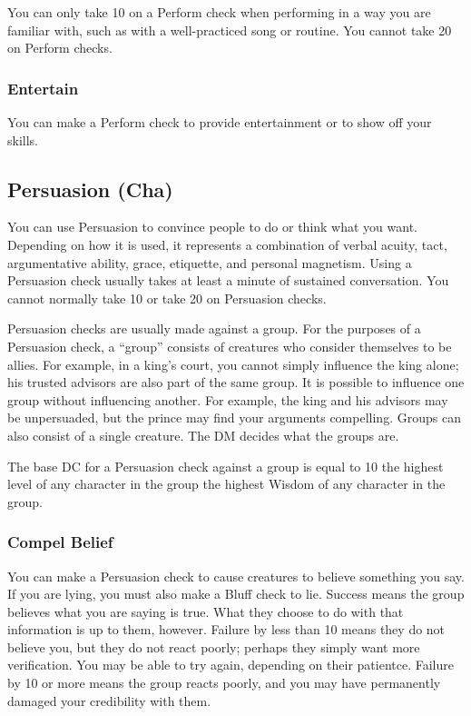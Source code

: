 You can only take 10 on a Perform check when performing in a way you are familiar with, such as with a well-practiced song or routine. You cannot take 20 on Perform checks.

\subsubsection{Entertain}
You can make a Perform check to provide entertainment or to show off your skills.

\subsection{Persuasion (Cha)}
You can use Persuasion to convince people to do or think what you want. Depending on how it is used, it represents a combination of verbal acuity, tact, argumentative ability, grace, etiquette, and personal magnetism. Using a Persuasion check usually takes at least a minute of sustained conversation. You cannot normally take 10 or take 20 on Persuasion checks.

Persuasion checks are usually made against a group. For the purposes of a Persuasion check, a ``group'' consists of creatures who consider themselves to be allies. For example, in a king's court, you cannot simply influence the king alone; his trusted advisors are also part of the same group. It is possible to influence one group without influencing another. For example, the king and his advisors may be unpersuaded, but the prince may find your arguments compelling. Groups can also consist of a single creature. The DM decides what the groups are.

The base DC for a Persuasion check against a group is equal to 10 \add the highest level of any character in the group \add the highest Wisdom of any character in the group.

\subsubsection{Compel Belief}
You can make a Persuasion check to cause creatures to believe something you say. If you are lying, you must also make a Bluff check to lie. Success means the group believes what you are saying is true. What they choose to do with that information is up to them, however. Failure by less than 10 means they do not believe you, but they do not react poorly; perhaps they simply want more verification. You may be able to try again, depending on their patientce. Failure by 10 or more means the group reacts poorly, and you may have permanently damaged your credibility with them.

